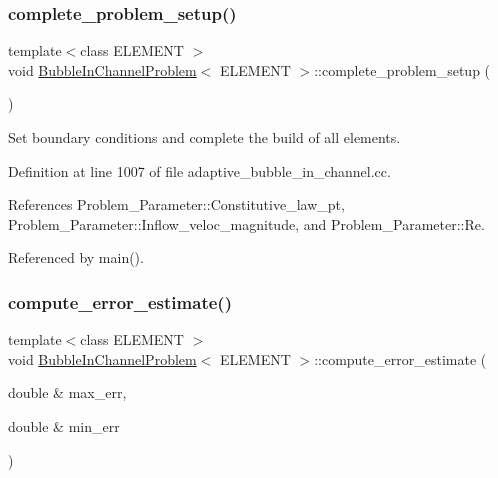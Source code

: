 \subsubsection{\texorpdfstring{complete\+\_\+problem\+\_\+setup()}{complete\_problem\_setup()}}
{\footnotesize\ttfamily template$<$class E\+L\+E\+M\+E\+NT $>$ \\
void \hyperlink{classBubbleInChannelProblem}{Bubble\+In\+Channel\+Problem}$<$ E\+L\+E\+M\+E\+NT $>$\+::complete\+\_\+problem\+\_\+setup (\begin{DoxyParamCaption}{ }\end{DoxyParamCaption})}



Set boundary conditions and complete the build of all elements. 



Definition at line 1007 of file adaptive\+\_\+bubble\+\_\+in\+\_\+channel.\+cc.



References Problem\+\_\+\+Parameter\+::\+Constitutive\+\_\+law\+\_\+pt, Problem\+\_\+\+Parameter\+::\+Inflow\+\_\+veloc\+\_\+magnitude, and Problem\+\_\+\+Parameter\+::\+Re.



Referenced by main().

\mbox{\label{classBubbleInChannelProblem_ad400025c03926745e230e5f654c28562}} 
\subsubsection{\texorpdfstring{compute\+\_\+error\+\_\+estimate()}{compute\_error\_estimate()}}
{\footnotesize\ttfamily template$<$class E\+L\+E\+M\+E\+NT $>$ \\
void \hyperlink{classBubbleInChannelProblem}{Bubble\+In\+Channel\+Problem}$<$ E\+L\+E\+M\+E\+NT $>$\+::compute\+\_\+error\+\_\+estimate (\begin{DoxyParamCaption}\item[{double \&}]{max\+\_\+err,  }\item[{double \&}]{min\+\_\+err }\end{DoxyParamCaption})}



